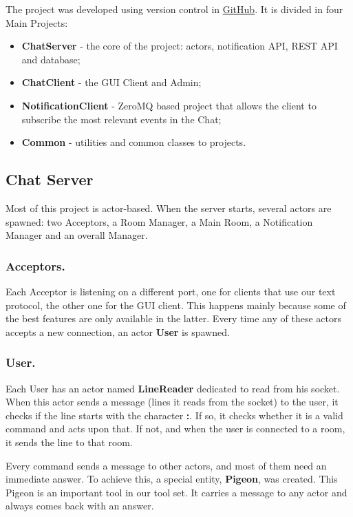
The project was developed using version control in \href{https://github.com/VolatileSD/ChatServer}{GitHub}. It is divided in four Main Projects:\\
\begin{itemize}
\item \textbf{ChatServer} - the core of the project: actors, notification API, REST API and database;
\item \textbf{ChatClient} - the GUI Client and Admin;
\item \textbf{NotificationClient} - ZeroMQ based project that allows the client to subscribe the most relevant events in the Chat;
\item \textbf{Common} - utilities and common classes to projects.
\end{itemize}

\subsection{Chat Server}
Most of this project is actor-based. When the server starts, several actors are spawned: two Acceptors, a Room Manager, a Main Room, a Notification Manager and an overall Manager.

\subsubsection{Acceptors.} Each Acceptor is listening on a different port, one for clients that use our text protocol, the other one for the GUI client. This happens mainly because some of the best features are only available in the latter. Every time any of these actors accepts a new connection, an actor \textbf{User} is spawned.

\subsubsection{User.} Each User has an actor named \textbf{LineReader} dedicated to read from his socket. When this actor sends a message (lines it reads from the socket) to the user, it checks if the line starts with the character \textbf{:}. If so, it  checks whether it is a valid command and acts upon that. If not, and when the user is connected to a room, it sends the line to that room.

Every command sends a message to other actors, and most of them need an immediate answer. To achieve this, a special entity, \textbf{Pigeon}, was created. This Pigeon is an important tool in our tool set. It carries a message to any actor and always comes back with an answer.


